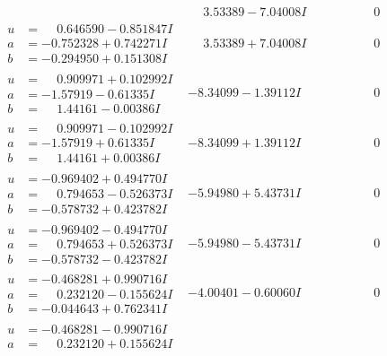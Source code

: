 \documentclass[1p]{elsarticle_modified}
\theoremstyle{definition}
\begin{document}
$$\begin{array}{c|c|c}
 & \phantom{-}3.53389 - 7.04008 I & \phantom{-0.000000 } 0 \\ \hline\begin{aligned}
u &= \phantom{-}0.646590 - 0.851847 I \\
a &= -0.752328 + 0.742271 I \\
b &= -0.294950 + 0.151308 I\end{aligned}
 & \phantom{-}3.53389 + 7.04008 I & \phantom{-0.000000 } 0 \\ \hline\begin{aligned}
u &= \phantom{-}0.909971 + 0.102992 I \\
a &= -1.57919 - 0.61335 I \\
b &= \phantom{-}1.44161 - 0.00386 I\end{aligned}
 & -8.34099 - 1.39112 I & \phantom{-0.000000 } 0 \\ \hline\begin{aligned}
u &= \phantom{-}0.909971 - 0.102992 I \\
a &= -1.57919 + 0.61335 I \\
b &= \phantom{-}1.44161 + 0.00386 I\end{aligned}
 & -8.34099 + 1.39112 I & \phantom{-0.000000 } 0 \\ \hline\begin{aligned}
u &= -0.969402 + 0.494770 I \\
a &= \phantom{-}0.794653 - 0.526373 I \\
b &= -0.578732 + 0.423782 I\end{aligned}
 & -5.94980 + 5.43731 I & \phantom{-0.000000 } 0 \\ \hline\begin{aligned}
u &= -0.969402 - 0.494770 I \\
a &= \phantom{-}0.794653 + 0.526373 I \\
b &= -0.578732 - 0.423782 I\end{aligned}
 & -5.94980 - 5.43731 I & \phantom{-0.000000 } 0 \\ \hline\begin{aligned}
u &= -0.468281 + 0.990716 I \\
a &= \phantom{-}0.232120 - 0.155624 I \\
b &= -0.044643 + 0.762341 I\end{aligned}
 & -4.00401 - 0.60060 I & \phantom{-0.000000 } 0 \\ \hline\begin{aligned}
u &= -0.468281 - 0.990716 I \\
a &= \phantom{-}0.232120 + 0.155624 I \\

\end{aligned}
\end{array}$$
\end{document}
